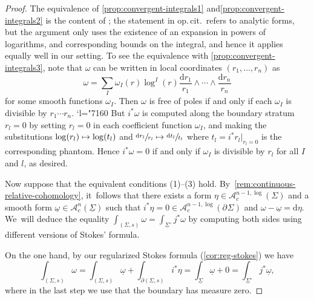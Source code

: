 \documentclass[10pt]{amsart}
\newcommand{\Changel}{\mathcode`l="7160}
\let\oldbullet\bullet
\renewcommand{\bullet}{{\raisebox{1pt}{$\scriptscriptstyle\oldbullet$}}}
\newcommand\mto{\mathchoice{\longmapsto}{\mapsto}{\mapsto}{\mapsto}}
\newcommand{\dslog}[1]{\sfrac{\dd#1}{#1}}
\theoremstyle{definition}
\theoremstyle{remark}
\newcommand{\uomega}{\underline{\omega}}
\newcommand{\rbrac}[1]{\left(#1\right)}
\newcommand{\dd}{\mathrm{d}}
\newcommand{\dlog}[1]{\frac{\dd#1}{#1}}
\newcommand{\Ac}[2][\bullet]{\mathscr{A}_c^{#1}\rbrac{#2}}
\newcommand{\Alogc}[2][\bullet]{\mathscr{A}^{#1,\log}_c(#2)}
\newcommand{\Sig}{\Sigma}
\newcommand{\uSig}{\underline{\Sigma}}
\newcommand{\uSigo}{\underline{\Sigma}^\circ}
\newcommand{\bdSig}[1][]{\partial^{#1}\Sigma}
\begin{document}
\begin{proof}
The equivalence of \eqref{prop:convergent-integrals1} and\eqref{prop:convergent-integrals2} is the content of \cite[Lem.\,4.9]{Brown2009}; the statement in {op.\,cit.}~refers to analytic forms, but the argument only uses the existence of an expansion in powers of logarithms, and corresponding bounds on the integral, and hence it applies equally well in our setting. To see the equivalence with \eqref{prop:convergent-integrals3}, note that $\omega$ can be written in local coordinates $(r_1,\ldots,r_n)$ as
\[
\omega = \sum_I \omega_I(r)\log^I(r) \dlog{r_1} \wedge \cdots\wedge \dlog{r_n}
\]
for some smooth functions $\omega_I$. Then $\omega$ is free of poles if and only if each $\omega_I$ is divisible by $r_1\cdots r_n$.
\Changel{}%
But $i^*\omega$ is computed along the boundary stratum $r_l = 0$ by setting $r_l=0$ in each coefficient function $\omega_I$, and making the substitutions $\log(r_l) \mto \log(t_l)$ and $\dslog{r_l}\mto \dslog{t_l}$ where $t_l = i^*r_l|_{r_l=0}$ is the corresponding phantom. Hence $i^*\omega = 0$ if and only if $\omega_I$ is divisible by $r_l$ for all $I$ and $l$, as desired.

Now suppose that the equivalent conditions (1)--(3) hold. By~\autoref{rem:continuous-relative-cohomology}, it~follows that there exists a form $\eta \in \Alogc[n-1]{\Sig}$ and a smooth form $\uomega \in \Ac[n]{\uSig}$ such that $i^*\eta = 0 \in \Alogc[n-1]{\bdSig}$ and $\omega - \underline{\omega} = \dd\eta$. We~will deduce the equality $\int_{(\Sig,s)}\omega = \int_{\uSigo} j^*\omega$ by computing both sides using different versions of Stokes' formula.

On the one hand, by our regularized Stokes formula (\autoref{cor:reg-stokes}) we have\vspace*{-3pt}
\begin{equation}
\int_{(\Sig,s)}\omega = \int_{(\Sig,s)}\underline{\omega} + \int_{\partial(\Sig,s)}i^*\eta = \int_{\uSig}\underline{\omega}+0 = \int_{\uSigo}j^*\underline{\omega},\label{eq:convergent-eq1}
\end{equation}
where in the last step we use that the boundary has measure zero.


\end{proof}
\end{document}
